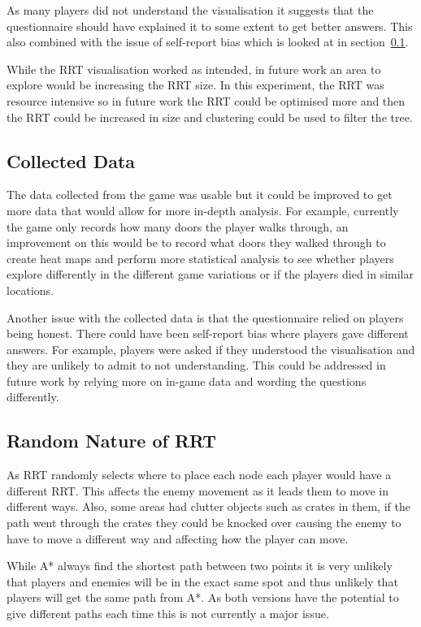 \documentclass[journal]{IEEEtran}
\begin{document}
	As many players did not understand the visualisation it suggests that the questionnaire should have explained it to some extent to get better answers. This also combined with the issue of self-report bias which is looked at in section~\ref{CData}. 
	
	While the RRT visualisation worked as intended, in future work an area to explore would be increasing the RRT size.  In this experiment, the RRT was resource intensive so in future work the RRT could be optimised more and then the RRT could be increased in size and clustering could be used to filter the tree.
	
	\subsection{Collected Data}    \label{CData}
	The data collected from the game was usable but it could be improved to get more data that would allow for more in-depth analysis. For example, currently the game only records how many doors the player walks through, an improvement on this would be to record what doors they walked through to create heat maps and perform more statistical analysis to see whether players explore differently in the different game variations or if the players died in similar locations.
	
	Another issue with the collected data is that the questionnaire relied on players being honest. There could have been self-report bias where players gave different answers.  For example, players were asked if they understood the visualisation and they are unlikely to admit to not understanding. This could be addressed in future work by relying more on in-game data and wording the questions differently.
	
	\subsection{Random Nature of RRT}
	As RRT randomly selects where to place each node each player would have a different RRT. This affects the enemy movement as it leads them to move in different ways. Also, some areas had clutter objects such as crates in them, if the path went through the crates they could be knocked over causing the enemy to have to move a different way and affecting how the player can move. 
	
	While A* always find the shortest path between two points it is very unlikely that players and enemies will be in the exact same spot and thus unlikely that players will get the same path from A*. As both versions have the potential to give different paths each time this is not currently a major issue.
	
\end{document}
